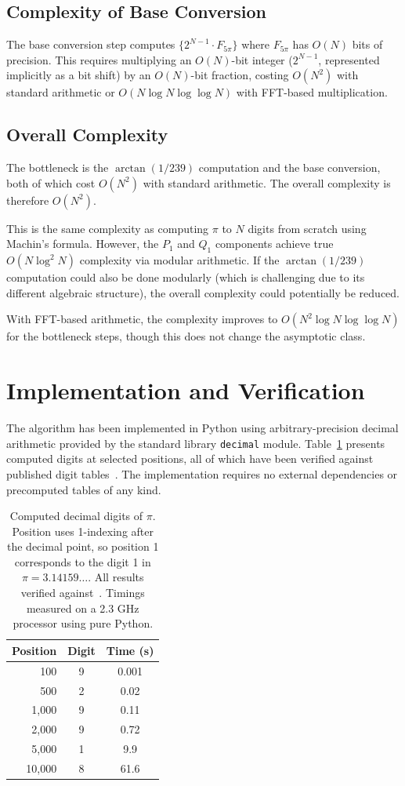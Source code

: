 \documentclass[11pt]{article}
\begin{document}
\subsection{Complexity of Base Conversion}

The base conversion step computes $\{2^{N-1} \cdot F_{5\pi}\}$ where $F_{5\pi}$ has $O(N)$ bits of precision. This requires multiplying an $O(N)$-bit integer ($2^{N-1}$, represented implicitly as a bit shift) by an $O(N)$-bit fraction, costing $O(N^2)$ with standard arithmetic or $O(N \log N \log \log N)$ with FFT-based multiplication.

\subsection{Overall Complexity}

The bottleneck is the $\arctan(1/239)$ computation and the base conversion, both of which cost $O(N^2)$ with standard arithmetic. The overall complexity is therefore $O(N^2)$.

This is the same complexity as computing $\pi$ to $N$ digits from scratch using Machin's formula. However, the $P_1$ and $Q_1$ components achieve true $O(N \log^2 N)$ complexity via modular arithmetic. If the $\arctan(1/239)$ computation could also be done modularly (which is challenging due to its different algebraic structure), the overall complexity could potentially be reduced.

With FFT-based arithmetic, the complexity improves to $O(N^2 \log N \log \log N)$ for the bottleneck steps, though this does not change the asymptotic class.

\section{Implementation and Verification}

The algorithm has been implemented in Python using arbitrary-precision decimal arithmetic provided by the standard library \texttt{decimal} module. Table~\ref{tab:results} presents computed digits at selected positions, all of which have been verified against published digit tables~\cite{pidigits}. The implementation requires no external dependencies or precomputed tables of any kind.

\begin{table}[h]
\centering
\begin{tabular}{rcc}
\toprule
Position & Digit & Time (s) \\
\midrule
100 & 9 & 0.001 \\
500 & 2 & 0.02 \\
1,000 & 9 & 0.11 \\
2,000 & 9 & 0.72 \\
5,000 & 1 & 9.9 \\
10,000 & 8 & 61.6 \\
\bottomrule
\end{tabular}
\caption{Computed decimal digits of $\pi$. Position uses 1-indexing after the decimal point, so position 1 corresponds to the digit 1 in $\pi = 3.14159\ldots$. All results verified against~\cite{pidigits}. Timings measured on a 2.3 GHz processor using pure Python.}
\label{tab:results}
\end{table}
\end{document}
